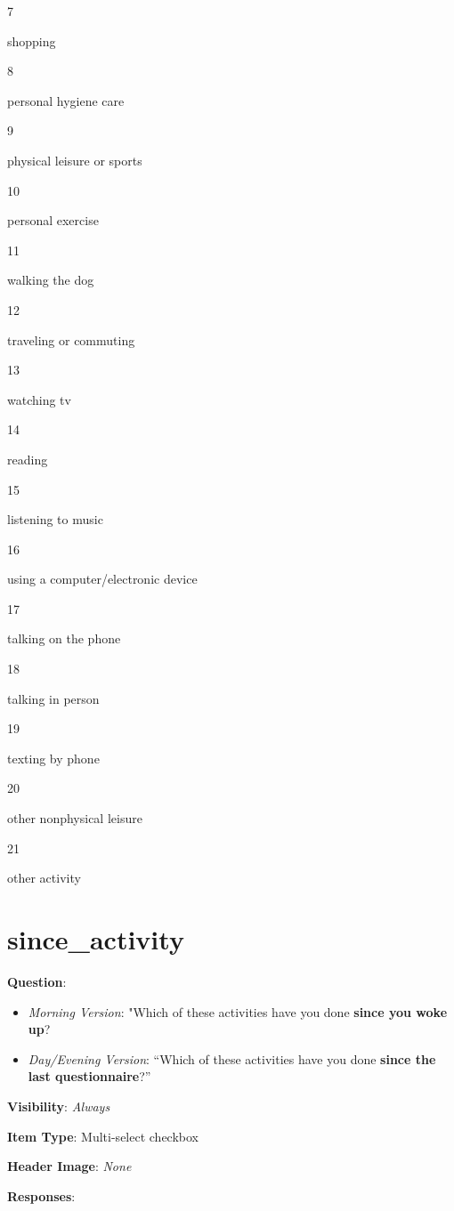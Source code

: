 \documentclass[]{book}
\providecommand{\tightlist}{%
  \setlength{\itemsep}{0pt}\setlength{\parskip}{0pt}}
\begin{document}
7

shopping

8

personal hygiene care

9

physical leisure or sports

10

personal exercise

11

walking the dog

12

traveling or commuting

13

watching tv

14

reading

15

listening to music

16

using a computer/electronic device

17

talking on the phone

18

talking in person

19

texting by phone

20

other nonphysical leisure

21

other activity

\hypertarget{since_activity}{%
\section{since\_activity}\label{since_activity}}

\textbf{Question}:

\begin{itemize}
\tightlist
\item
  \emph{Morning Version}: "Which of these activities have you done \textbf{since you woke up}?
\item
  \emph{Day/Evening Version}: ``Which of these activities have you done \textbf{since the last questionnaire}?''
\end{itemize}

\textbf{Visibility}: \emph{Always}

\textbf{Item Type}: Multi-select checkbox

\textbf{Header Image}: \emph{None}

\textbf{Responses}:
\end{document}
